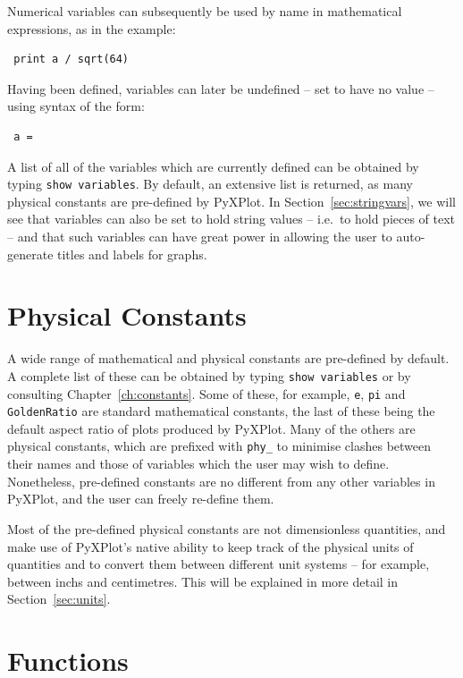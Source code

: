 \noindent Numerical variables can subsequently be used by name in mathematical
expressions, as in the example:

\begin{verbatim} print a / sqrt(64) \end{verbatim}

\noindent Having been defined, variables can later be undefined -- set to have
no value -- using syntax of the form:

\begin{verbatim} a = \end{verbatim}

A list of all of the variables which are currently defined can be obtained by
typing {\tt show variables}. By default, an extensive
list is returned, as many physical constants are pre-defined by PyXPlot. In
Section~\ref{sec:stringvars}, we will see that variables can also be set to
hold string values -- i.e.\ to hold pieces of text -- and that such variables
can have great power in allowing the user to auto-generate titles and labels
for graphs.

\section{Physical Constants} \label{sec:constants} 

A wide range of mathematical and physical constants are pre-defined by default.
A complete list of these can be obtained by typing {\tt show variables} or by
consulting Chapter~\ref{ch:constants}. Some of these, for example, {\tt e},
{\tt pi} and {\tt GoldenRatio} are standard mathematical constants, the last of
these being the default aspect ratio of plots produced by PyXPlot. Many of the
others are physical constants, which are prefixed with {\tt phy\_} to minimise
clashes between their names and those of variables which the user may wish to
define.  Nonetheless, pre-defined constants are no different from any other
variables in PyXPlot, and the user can freely re-define them.

Most of the pre-defined physical constants are not dimensionless quantities,
and make use of PyXPlot's native ability to keep track of the physical units of
quantities and to convert them between different unit systems -- for example,
between inchs and centimetres.  This will be explained in more detail in
Section~\ref{sec:units}.

\section{Functions} \label{sec:functions}

